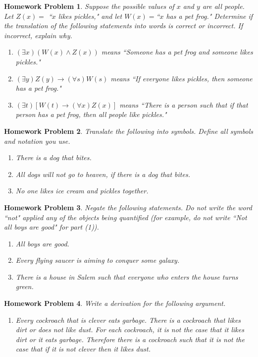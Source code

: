 \documentclass{article}
\newtheorem{hw}{Homework Problem}
\begin{document}
	\begin{hw}
		Suppose the possible values of $x$ and $y$ are all people. \newline Let $Z(x)= $ ``$x$ likes pickles," and let $W(x)=$``$x$ has a pet frog."  Determine if the translation of the following statements into words is correct or incorrect. If incorrect, explain why.
		\begin{enumerate}
			\item $(\exists x)(W(x) \wedge Z(x))$ means
			``Someone has a pet frog and someone likes pickles."
			\item $(\exists y) Z(y)\rightarrow (\forall s) W(s)$ means
			``If everyone likes pickles, then someone has a pet frog."
			\item $(\exists t)[W(t) \rightarrow (\forall x) Z(x)]$ means
			``There is a person such that if that person has a pet frog, then all people like pickles."
		\end{enumerate}
	\end{hw}
	\begin{hw}
		Translate the following into symbols. Define all symbols and notation you use.
		\begin{enumerate}
			\item There is a dog that bites.
			\item All dogs will not go to heaven, if there is a dog that bites.
			\item No one likes ice cream and pickles {\it together}.
		\end{enumerate}
	\end{hw}
	\begin{hw}
		Negate the following statements. Do not write the word ``not" applied any of the objects being quantified (for example, do not write ``Not all boys are good" for part (1)).
		\begin{enumerate}
			\item All boys are good.
			\item Every flying saucer is aiming to conquer some galaxy.
			\item There is a house in Salem such that everyone who enters the house turns green.
		\end{enumerate}
	\end{hw}
	\begin{hw}
		Write a derivation for the following argument.
		\begin{enumerate}
			\item Every cockroach that is clever eats garbage. There is a cockroach that likes dirt or does not like dust. For each cockroach, it is not the case that it likes dirt or it eats garbage. Therefore there is a cockroach such that it is not the case that if it is not clever then it likes dust.
		\end{enumerate}
	\end{hw}
\end{document}
